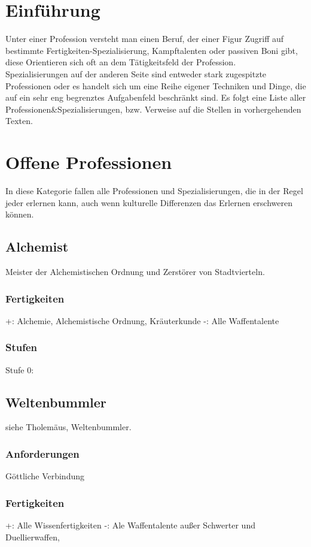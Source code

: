 \documentclass[a4paper,12pt,oneside]{book}
\begin{document}
\chapter{Einführung}
Unter einer Profession versteht man einen Beruf, der einer Figur Zugriff auf bestimmte Fertigkeiten-Spezialisierung, Kampftalenten oder passiven Boni gibt, diese Orientieren sich oft an dem Tätigkeitsfeld der Profession.
\\Spezialisierungen auf der anderen Seite sind entweder stark zugespitzte Professionen oder es handelt sich um eine Reihe eigener Techniken und Dinge, die auf ein sehr eng begrenztes Aufgabenfeld beschränkt sind.
Es folgt eine Liste aller Professionen\&Spezialisierungen, bzw. Verweise auf die Stellen in vorhergehenden Texten.
\chapter{Offene Professionen}
In diese Kategorie fallen alle Professionen und Spezialisierungen, die in der Regel jeder erlernen kann, auch wenn kulturelle Differenzen das Erlernen erschweren können.
\section{Alchemist}
Meister der Alchemistischen Ordnung und Zerstörer von Stadtvierteln.
\subsection{Fertigkeiten}
+: Alchemie, Alchemistische Ordnung, Kräuterkunde
-: Alle Waffentalente
\subsection{Stufen}
\begin{description}
\item[Stufe 0:]
\end{description}

\section{Weltenbummler}
siehe Tholemäus, Weltenbummler.
\subsection{Anforderungen}
Göttliche Verbindung
\subsection{Fertigkeiten}
+: Alle Wissenfertigkeiten
-: Ale Waffentalente außer Schwerter und Duellierwaffen, 
\end{document}
